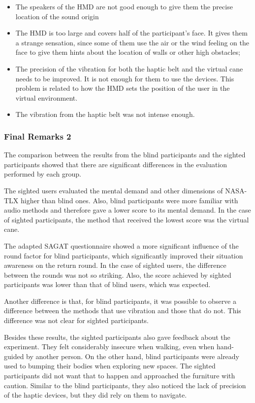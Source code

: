 \begin{itemize}
    \item The speakers of the HMD are not good enough to give them the precise location of the sound origin
    \item The HMD is too large and covers half of the participant's face. It gives them a strange sensation, since some of them use the air or the wind feeling on the face to give them hints about the location of walls or other high obstacles;
    \item The precision of the vibration for both the haptic belt and the virtual cane needs to be improved. It is not enough for them to use the devices. This problem is related to how the HMD sets the position of the user in the virtual environment. \\    
    \item The vibration from the haptic belt was not intense enough.
\end{itemize}


\subsubsection*{Final Remarks 2}

The comparison between the results from the blind participants and the sighted participants showed that there are significant differences in the evaluation performed by each group.

The sighted users evaluated the mental demand and other dimensions of NASA-TLX higher than blind ones. Also, blind participants were more familiar with audio methods and therefore gave a lower score to its mental demand. In the case of sighted participants, the method that received the lowest score was the virtual cane. 

The adapted SAGAT questionnaire showed a more significant influence of the round factor for blind participants, which significantly improved their situation awareness on the return round. In the case of sighted users, the difference between the rounds was not so striking. Also, the score achieved by sighted participants was lower than that of blind users, which was expected.

Another difference is that, for blind participants, it was possible to observe a difference between the methods that use vibration and those that do not. This difference was not clear for sighted participants. 

Besides these results, the sighted participants also gave feedback about the experiment. They felt considerably insecure when walking, even when hand-guided by another person. On the other hand, blind participants were already used to bumping their bodies when exploring new spaces. The sighted participants did not want that to happen and approached the furniture with caution. Similar to the blind participants, they also noticed the lack of precision of the haptic devices, but they did rely on them to navigate.